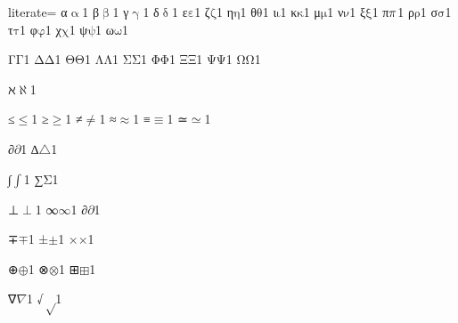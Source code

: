 {%
literate=
{α}{{\ensuremath{\mathrm{\upalpha}}}}1
{β}{{\ensuremath{\mathrm{\upbeta}}}}1
{γ}{{\ensuremath{\mathrm{\upgamma}}}}1
{δ}{{\ensuremath{\mathrm{\updelta}}}}1
{ε}{{\ensuremath{\mathrm{\varepsilon}}}}1
{ζ}{{\ensuremath{\mathrm{\zeta}}}}1
{η}{{\ensuremath{\mathrm{\eta}}}}1
{θ}{{\ensuremath{\mathrm{\theta}}}}1
{ι}{{\ensuremath{\mathrm{\iota}}}}1
{κ}{{\ensuremath{\mathrm{\kappa}}}}1
{μ}{{\ensuremath{\mathrm{\mu}}}}1
{ν}{{\ensuremath{\mathrm{\nu}}}}1
{ξ}{{\ensuremath{\mathrm{\xi}}}}1
{π}{{\ensuremath{\mathrm{\mathnormal{\pi}}}}}1
{ρ}{{\ensuremath{\mathrm{\rho}}}}1
{σ}{{\ensuremath{\mathrm{\sigma}}}}1
{τ}{{\ensuremath{\mathrm{\tau}}}}1
{φ}{{\ensuremath{\mathrm{\varphi}}}}1
{χ}{{\ensuremath{\mathrm{\chi}}}}1
{ψ}{{\ensuremath{\mathrm{\psi}}}}1
{ω}{{\ensuremath{\mathrm{\omega}}}}1

{Γ}{{\ensuremath{\mathrm{\Gamma}}}}1
{Δ}{{\ensuremath{\mathrm{\Delta}}}}1
{Θ}{{\ensuremath{\mathrm{\Theta}}}}1
{Λ}{{\ensuremath{\mathrm{\Lambda}}}}1
{Σ}{{\ensuremath{\mathrm{\Sigma}}}}1
{Φ}{{\ensuremath{\mathrm{\Phi}}}}1
{Ξ}{{\ensuremath{\mathrm{\Xi}}}}1
{Ψ}{{\ensuremath{\mathrm{\Psi}}}}1
{Ω}{{\ensuremath{\mathrm{\Omega}}}}1

{ℵ}{{\ensuremath{\aleph}}}1

{≤}{{\color{symbolcolor}\ensuremath{\leq}}}1
{≥}{{\color{symbolcolor}\ensuremath{\geq}}}1
{≠}{{\color{symbolcolor}\ensuremath{\neq}}}1
{≈}{{\color{symbolcolor}\ensuremath{\approx}}}1
{≡}{{\color{symbolcolor}\ensuremath{\equiv}}}1
{≃}{{\color{symbolcolor}\ensuremath{\simeq}}}1

{∂}{{\color{symbolcolor}\ensuremath{\partial}}}1
{∆}{{\color{symbolcolor}\ensuremath{\triangle}}}1 %

{∫}{{\color{symbolcolor}\ensuremath{\int}}}1
{∑}{{\color{symbolcolor}\ensuremath{\mathrm{\Sigma}}}}1

{⊥}{{\color{symbolcolor}\ensuremath{\perp}}}1
{∞}{{\color{symbolcolor}\ensuremath{\infty}}}1
{∂}{{\color{symbolcolor}\ensuremath{\partial}}}1

{∓}{{\color{symbolcolor}\ensuremath{\mp}}}1
{±}{{\color{symbolcolor}\ensuremath{\pm}}}1
{×}{{\color{symbolcolor}\ensuremath{\times}}}1

{⊕}{{\color{symbolcolor}\ensuremath{\oplus}}}1
{⊗}{{\color{symbolcolor}\ensuremath{\otimes}}}1
{⊞}{{\color{symbolcolor}\ensuremath{\boxplus}}}1

{∇}{{\color{symbolcolor}\ensuremath{\nabla}}}1
{√}{{\color{symbolcolor}\ensuremath{\sqrt}}}1

}
